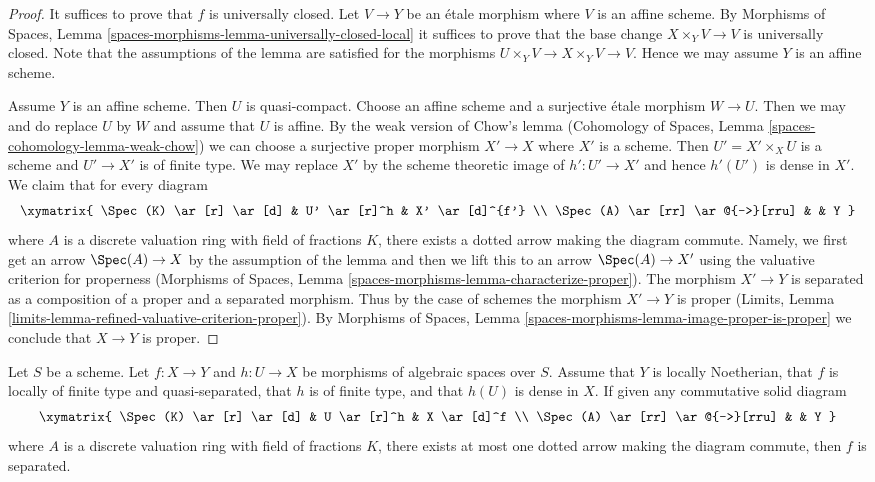 \begin{proof}
It suffices to prove that $f$ is universally closed.
Let $V \to Y$ be an \'etale morphism where $V$ is an affine scheme.
By Morphisms of Spaces, Lemma
\ref{spaces-morphisms-lemma-universally-closed-local}
it suffices to prove that the base change $X \times_Y V \to V$ is
universally closed. Note that the assumptions of the lemma are
satisfied for the morphisms $U \times_Y V \to X \times_Y V \to V$.
Hence we may assume $Y$ is an affine scheme.

\medskip\noindent
Assume $Y$ is an affine scheme. Then $U$ is quasi-compact. Choose
an affine scheme and a surjective \'etale morphism $W \to U$.
Then we may and do replace $U$ by $W$ and assume that $U$ is affine.
By the weak version of Chow's lemma
(Cohomology of Spaces, Lemma \ref{spaces-cohomology-lemma-weak-chow})
we can choose a surjective proper morphism $X' \to X$
where $X'$ is a scheme. Then $U' = X' \times_X U$ is a scheme
and $U' \to X'$ is of finite type. We may replace $X'$ by
the scheme theoretic image of $h' : U' \to X'$ and hence $h'(U')$
is dense in $X'$. We claim that for every diagram
$$
\xymatrix{
\Spec(K) \ar[r] \ar[d] & U' \ar[r]^h & X' \ar[d]^{f'} \\
\Spec(A) \ar[rr] \ar@{-->}[rru] & & Y
}
$$
where $A$ is a discrete valuation ring with field of fractions $K$, there
exists a dotted arrow making the diagram commute. Namely, we first get an
arrow $\Spec(A) \to X$ by the assumption of the lemma and then we lift this
to an arrow $\Spec(A) \to X'$ using the valuative criterion for properness
(Morphisms of Spaces, Lemma \ref{spaces-morphisms-lemma-characterize-proper}).
The morphism $X' \to Y$ is separated
as a composition of a proper and a separated morphism.
Thus by the case of schemes the morphism $X' \to Y$ is proper
(Limits, Lemma
\ref{limits-lemma-refined-valuative-criterion-proper}).
By Morphisms of Spaces, Lemma
\ref{spaces-morphisms-lemma-image-proper-is-proper}
we conclude that $X \to Y$ is proper.
\end{proof}

\begin{lemma}
\label{lemma-refined-valuative-criterion-separated}
Let $S$ be a scheme. Let $f : X \to Y$ and $h : U \to X$ be
morphisms of algebraic spaces over $S$. Assume that $Y$ is
locally Noetherian, that $f$ is locally of finite type and quasi-separated,
that $h$ is of finite type, and that $h(U)$ is dense in $X$.
If given any commutative solid diagram
$$
\xymatrix{
\Spec(K) \ar[r] \ar[d] & U \ar[r]^h & X \ar[d]^f \\
\Spec(A) \ar[rr] \ar@{-->}[rru] & & Y
}
$$
where $A$ is a discrete valuation ring with field of fractions $K$, there
exists at most one dotted arrow making the diagram commute, then $f$ is
separated.
\end{lemma}

